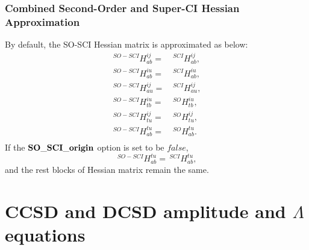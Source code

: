 \documentclass[a4paper,12pt,oneside]{book}
\newcommand{\pre}[1]{\,#1\!}
\begin{document}
\subsection{Combined Second-Order and Super-CI Hessian Approximation}
By default, the SO-SCI Hessian matrix \cite{kreplinMCSCF2020} is approximated as below:
\begin{equation}
\begin{aligned}
\pre{^{SO-SCI}}H_{ab}^{ij} =& \pre{^{SCI}}H_{ab}^{ij},\\
\pre{^{SO-SCI}}H_{ab}^{iu} =& \pre{^{SCI}}H_{ab}^{iu},\\
\pre{^{SO-SCI}}H_{au}^{ij} =& \pre{^{SCI}}H_{au}^{ij},\\
\pre{^{SO-SCI}}H_{tb}^{iu} =& \pre{^{SO}}H_{tb}^{iu},\\
\pre{^{SO-SCI}}H_{tu}^{ij} =& \pre{^{SO}}H_{tu}^{ij},\\
\pre{^{SO-SCI}}H_{ab}^{tu} =& \pre{^{SO}}H_{ab}^{tu}.\\
\end{aligned}
\end{equation}
If the $\bf{SO\_SCI\_origin}$ option is set to be $false$, 
\begin{equation}
  \pre{^{SO-SCI}}H_{ab}^{tu} = \pre{^{SCI}}H_{ab}^{tu},
\end{equation}
and the rest blocks of Hessian matrix remain the same.

\chapter{CCSD and DCSD amplitude and $\Lambda$ equations}
\end{document}
